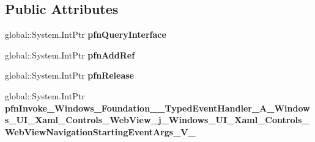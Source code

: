 \subsection*{Public Attributes}
\begin{DoxyCompactItemize}
\item 
\mbox{\label{struct_windows_1_1_foundation_1_1_typed_event_handler___a___windows___u_i___xaml___controls___we35912db850c22c9b2be1a07564605cd2_a757d1672b471a9d8719e4c4d3af2e368}} 
global\+::\+System.\+Int\+Ptr {\bfseries pfn\+Query\+Interface}
\item 
\mbox{\label{struct_windows_1_1_foundation_1_1_typed_event_handler___a___windows___u_i___xaml___controls___we35912db850c22c9b2be1a07564605cd2_a7b86b2ab373bd18a00164a1317e70339}} 
global\+::\+System.\+Int\+Ptr {\bfseries pfn\+Add\+Ref}
\item 
\mbox{\label{struct_windows_1_1_foundation_1_1_typed_event_handler___a___windows___u_i___xaml___controls___we35912db850c22c9b2be1a07564605cd2_aabead4333eb9a70b3cc0f7b067c8176c}} 
global\+::\+System.\+Int\+Ptr {\bfseries pfn\+Release}
\item 
\mbox{\label{struct_windows_1_1_foundation_1_1_typed_event_handler___a___windows___u_i___xaml___controls___we35912db850c22c9b2be1a07564605cd2_ac5391df40d4aea581f4bd739381ccf6c}} 
global\+::\+System.\+Int\+Ptr {\bfseries pfn\+Invoke\+\_\+\+Windows\+\_\+\+Foundation\+\_\+\+\_\+\+Typed\+Event\+Handler\+\_\+\+A\+\_\+\+Windows\+\_\+\+U\+I\+\_\+\+Xaml\+\_\+\+Controls\+\_\+\+Web\+View\+\_\+j\+\_\+\+Windows\+\_\+\+U\+I\+\_\+\+Xaml\+\_\+\+Controls\+\_\+\+Web\+View\+Navigation\+Starting\+Event\+Args\+\_\+\+V\+\_\+}
\end{DoxyCompactItemize}
